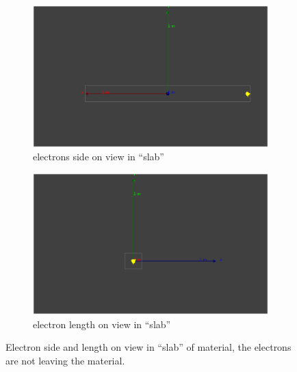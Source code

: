 \begin{figure}[htbp]
\centering
\begin{subfigure}{.5\textwidth}
  \centering
  \includegraphics[width=\linewidth]{e-_10MeV_Length_on_view.png}
  \captionsetup{width=.9\linewidth}
  \caption{electrons side on view in ``slab''}
  \label{subFig:electron_side_slab}
\end{subfigure}%
\begin{subfigure}{.5\textwidth}
  \centering
  \includegraphics[width=\linewidth]{e-_10MeV_side_on_view.png}
  \captionsetup{width=.9\linewidth}
  \caption{electron length on view in ``slab''}
  \label{subFig:electron_length_slab}
\end{subfigure}
\caption{Electron side and length on view in ``slab'' of material, the electrons are not leaving the material.}
\label{fig:electrons_viewed_in_slab}
\end{figure}

